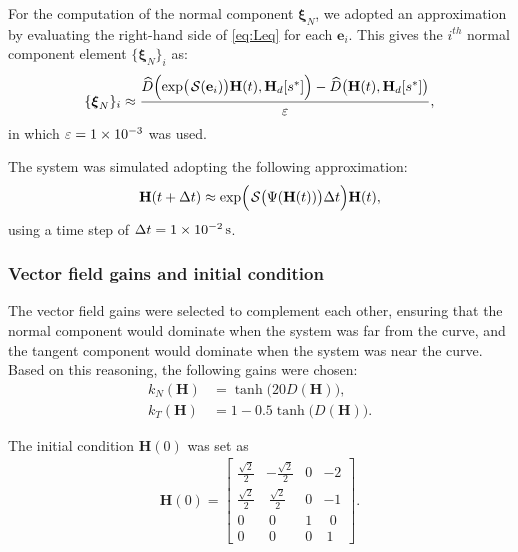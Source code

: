 For the computation of the normal component $\boldsymbol{\xi}_N$, we adopted an approximation by evaluating the right-hand side of \eqref{eq:Leq} for each $\mathbf{e}_i$. This gives the $i^{th}$ normal component element $\{\boldsymbol{\xi}_{N}\}_{i}$ as:
\begin{align}
    \{\boldsymbol{\xi}_{N}\}_{i} \approx \frac{\widehat{D}\Bigl(\exp\bigl(\SL[\boldsymbol{\mathbf{e}}_i]\bigr)\mathbf{H}(t), \mathbf{H}_d[s^*]\Bigr) - \widehat{D}\bigl(\mathbf{H}(t), \mathbf{H}_d[s^*]\bigr)}{\varepsilon},
\end{align} 
in which $\varepsilon = \num{1E-3}$ was used.

The system was simulated adopting the following approximation:
\begin{align}
    \mathbf{H}(t + \Delta t) \approx \exp\Bigl(\SL\bigl(\Psi(\mathbf{H}(t))\bigr)\Delta t\Bigr)\mathbf{H}(t),
\end{align}
using a time step of $\Delta t = \qty{1E-2}{\second}$. 
\subsubsection{Vector field gains and initial condition}
The vector field gains were selected to complement each other, ensuring that the normal component would dominate when the system was far from the curve, and the tangent component would dominate when the system was near the curve. Based on this reasoning, the following gains were chosen:
\begin{align}
    k_N(\mathbf{H}) &= \tanh\bigl(20D(\mathbf{H})\bigr),\\
    k_T(\mathbf{H}) &= 1 - 0.5\tanh\bigl(D(\mathbf{H})\bigr).
\end{align}

The initial condition $\mathbf{H}(0)$ was set as
\begin{align}
    \mathbf{H}(0) = \begin{bmatrix}
        \frac{\sqrt{2}}{2} & -\frac{\sqrt{2}}{2} & 0 & -2\\
        \frac{\sqrt{2}}{2} & \ \frac{\sqrt{2}}{2} & 0 & -1\\
        0 & \ 0 & 1 & \ \ 0\\
        0 & \ 0 & 0 & \ 1
    \end{bmatrix}.
\end{align}

